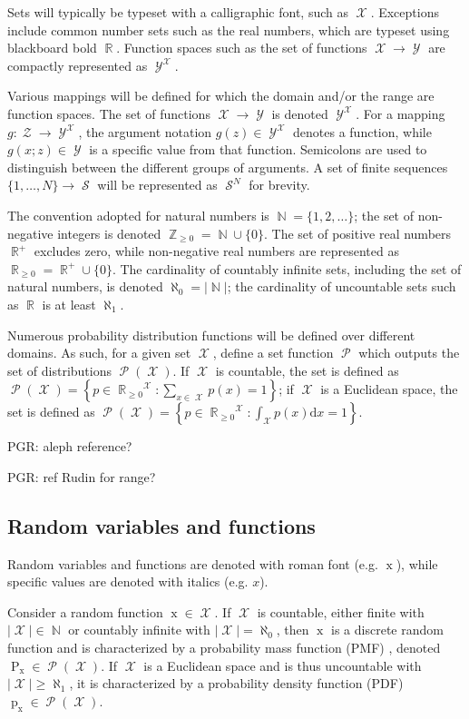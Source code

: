 \documentclass[12pt]{report}
\DeclareMathOperator{\xrm}{\mathrm{x}}
\DeclareMathOperator{\Prm}{\mathrm{P}}
\DeclareMathOperator{\prm}{\mathrm{p}}
\DeclareMathOperator{\Xcal}{\mathcal{X}}
\DeclareMathOperator{\Ycal}{\mathcal{Y}}
\DeclareMathOperator{\Zcal}{\mathcal{Z}}
\DeclareMathOperator{\Scal}{\mathcal{S}}
\DeclareMathOperator{\Pcal}{\mathcal{P}}
\DeclareMathOperator{\Rbb}{\mathbb{R}}
\DeclareMathOperator{\Nbb}{\mathbb{N}}
\DeclareMathOperator{\Zbb}{\mathbb{Z}}
\begin{document}
Sets will typically be typeset with a calligraphic font, such as $\Xcal$. Exceptions include common number sets such as the real numbers, which are typeset using blackboard bold $\Rbb$. Function spaces such as the set of functions $\Xcal \to \Ycal$ are compactly represented as $\Ycal^{\Xcal}$.

Various mappings will be defined for which the domain and/or the range are function spaces. The set of functions $\Xcal \to \Ycal$ is denoted $\Ycal^{\Xcal}$. For a mapping $g : \Zcal \to \Ycal^{\Xcal}$, the argument notation $g(z) \in \Ycal^{\Xcal}$ denotes a function, while $g(x;z) \in \Ycal$ is a specific value from that function. Semicolons are used to distinguish between the different groups of arguments. A set of finite sequences $\{1,\ldots,N\} \to \Scal$ will be represented as $\Scal^N$ for brevity.

The convention adopted for natural numbers is $\Nbb = \{1,2,\ldots\}$; the set of non-negative integers is denoted $\Zbb_{\geq 0} = \Nbb \cup \{0\}$. The set of positive real numbers $\Rbb^+$ excludes zero, while non-negative real numbers are represented as $\Rbb_{\geq 0} = \Rbb^+ \cup \{0\}$. The cardinality of countably infinite sets, including the set of natural numbers, is denoted $\aleph_0 = |\Nbb|$; the cardinality of uncountable sets such as $\Rbb$ is at least $\aleph_1$.

Numerous probability distribution functions will be defined over different domains. As such, for a given set $\Xcal$, define a set function $\Pcal$ which outputs the set of distributions $\Pcal(\Xcal)$. If $\Xcal$ is countable, the set is defined as $\Pcal(\Xcal) = \left\{ p \in {\Rbb_{\geq 0}}^{\Xcal}: \sum_{x \in \Xcal} p(x) = 1 \right\}$; if $\Xcal$ is a Euclidean space, the set is defined as $\Pcal(\Xcal) = \left\{ p \in {\Rbb_{\geq 0}}^{\Xcal}: \int_{\Xcal} p(x) \mathrm{d}x = 1 \right\}$.

PGR: aleph reference?

PGR: ref Rudin for range?



\subsection*{Random variables and functions}

Random variables and functions are denoted with roman font (e.g. $\xrm$), while specific values are denoted with italics (e.g. $x$). 

Consider a random function $\xrm \in \Xcal$. If $\Xcal$ is countable, either finite with $|\Xcal| \in \Nbb$ or countably infinite with $|\Xcal| = \aleph_0$, then $\xrm$ is a discrete random function and is characterized by a probability mass function (PMF) \cite {papoulis}, denoted $\Prm_{\xrm} \in \Pcal(\Xcal)$. If $\Xcal$ is a Euclidean space and is thus uncountable with $|\Xcal| \geq \aleph_1$, it is characterized by a probability density function (PDF) $\prm_{\xrm} \in \Pcal(\Xcal)$.
\end{document}
